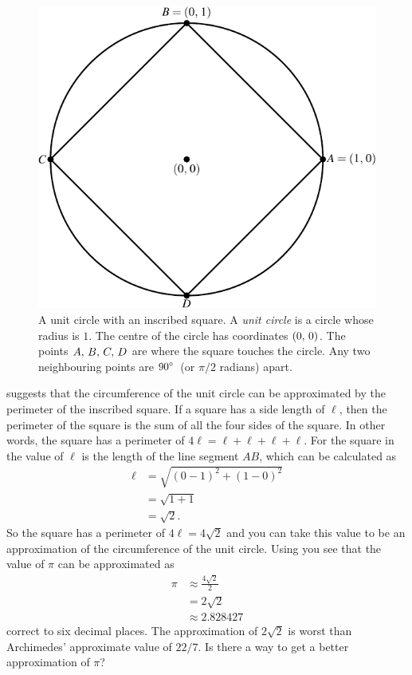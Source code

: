 \documentclass[a4paper,oneside,12pt]{article}
\begin{document}
\begin{figure}[!htbp]
\centering
\includegraphics[scale=1.1]{image/05/circle-square.pdf}
\caption{%
  A unit circle with an inscribed square.  A \emph{unit circle} is a
  circle whose radius is $1$.  The centre of the circle has
  coordinates $\left\lparen{0},\, {0}\right\rparen$.  The points ${A},\, {B},\, {C},\, {D}$ are
  where the square touches the circle.  Any two neighbouring points
  are ${90}^{\circ}$~(or $\pi / 2$ radians) apart.
}
\label{fig:circle_inscribed_square}
\end{figure}

 suggests that the circumference
of the unit circle can be approximated by the perimeter of the
inscribed square.  If a square has a side length of $\ell$, then the
perimeter of the square is the sum of all the four sides of the
square.  In other words, the square has a perimeter of
$4\ell = \ell + \ell + \ell + \ell$.  For the square in
 the value of $\ell$ is the length
of the line segment $AB$, which can be calculated as
\begin{align*}
\ell
&=
\sqrt{(0 - 1)^2 + (1 - 0)^2} \\[4pt]
&=
\sqrt{1 + 1} \\[4pt]
&=
\sqrt{2}.
\end{align*}
So the square has a perimeter of $4\ell = 4\sqrt{2}$ and you can take
this value to be an approximation of the circumference of the unit
circle.  Using  you see
that the value of $\pi$ can be approximated as
\begin{equation}
\label{eqn:approximate_pi_inscribed_square}
\begin{aligned}
\pi
&\approx
\frac{4\sqrt{2}}{2} \\[4pt]
&=
2\sqrt{2} \\[4pt]
&\approx
2.828427
\end{aligned}
\end{equation}
correct to six decimal places.  The approximation of $2\sqrt{2}$ is
worst than Archimedes' approximate value of $22/7$.  Is there a way to
get a better approximation of $\pi$?
\end{document}
